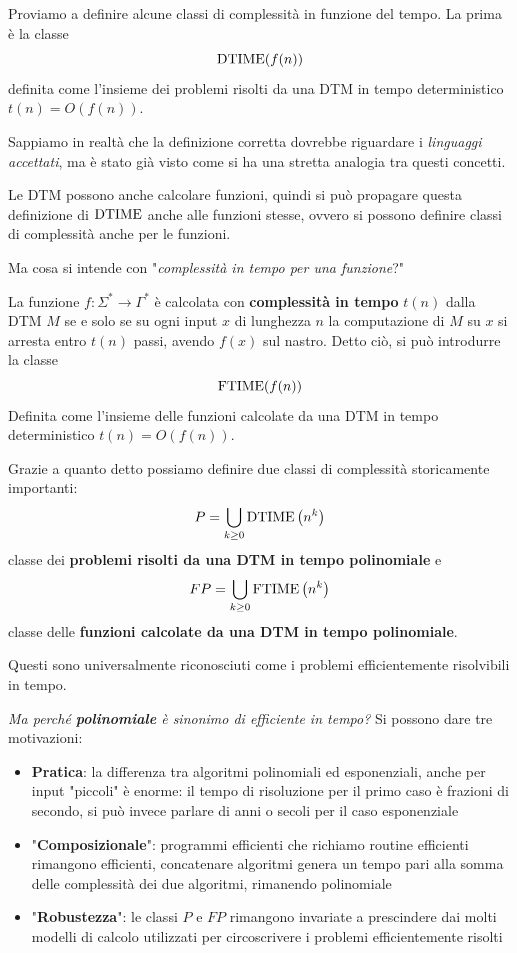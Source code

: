 Proviamo a definire alcune classi di complessità in funzione del tempo. La prima è la classe
$$ \text{DTIME}(f(n)) $$
definita come l'insieme dei problemi risolti da una DTM in tempo deterministico $t(n) = O(f(n))$. 

Sappiamo in realtà che la definizione corretta dovrebbe riguardare i \textit{linguaggi accettati}, ma è stato già visto come si ha una stretta analogia tra questi concetti.

Le DTM possono anche calcolare funzioni, quindi si può propagare questa definizione di $\text{DTIME}$ anche alle funzioni stesse, ovvero si possono definire classi di complessità anche per le funzioni.

Ma cosa si intende con "\textit{complessità in tempo per una funzione}?"

La funzione $f: \Sigma^\ast \rightarrow \Gamma^\ast$ è calcolata con \textbf{complessità in tempo} $t(n)$ dalla DTM $M$ se e solo se su ogni input $x$ di lunghezza $n$ la computazione di $M$ su $x$ si arresta entro $t(n)$ passi, avendo $f(x)$ sul nastro. Detto ciò, si può introdurre la classe
$$ \text{FTIME} (f(n)) $$
Definita come l'insieme delle funzioni calcolate da una DTM in tempo deterministico $t(n) = O(f(n))$.

Grazie a quanto detto possiamo definire due classi di complessità storicamente importanti: 
$$ P = \bigcup_{k \geq 0} \text{DTIME} \left(n^k\right) $$
classe dei \textbf{problemi risolti da una DTM in tempo polinomiale} e 
$$ FP = \bigcup_{k \geq 0} \text{FTIME} \left(n^k\right)$$
classe delle \textbf{funzioni calcolate da una DTM in tempo polinomiale}.

Questi sono universalmente riconosciuti come i problemi efficientemente risolvibili in tempo.

\textit{Ma perché \textbf{polinomiale} è sinonimo di efficiente in tempo?} Si possono dare tre motivazioni: 
\begin{itemize}
	\item \textbf{Pratica}: la differenza tra algoritmi polinomiali ed esponenziali, anche per input "piccoli" è enorme: il tempo di risoluzione per il primo caso è frazioni di secondo, si può invece parlare di anni o secoli per il caso esponenziale
	
    \item "\textbf{Composizionale}": programmi efficienti che richiamo routine efficienti rimangono efficienti, concatenare algoritmi genera un tempo pari alla somma delle complessità dei due algoritmi, rimanendo polinomiale 
    
	\item "\textbf{Robustezza}": le classi $P$ e $FP$ rimangono invariate a prescindere dai molti modelli di calcolo utilizzati per circoscrivere i problemi efficientemente risolti 
\end{itemize}

